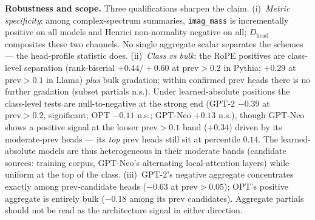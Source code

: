 \documentclass[11pt]{article}
\newcommand{\Dhead}{\ensuremath{D_{\text{head}}}\xspace}
\newcommand{\imagmass}{\texttt{imag\_mass}\xspace}
\newcommand{\Rope}{RoPE\xspace}
\begin{document}
\textbf{Robustness and scope.} Three qualifications sharpen the claim. (i)~\emph{Metric specificity}: among
complex-spectrum summaries, \imagmass is incrementally positive on all models and Henrici non-normality negative on
all; \Dhead composites these two channels. No single aggregate scalar separates the schemes --- the head-profile
statistic does. (ii)~\emph{Class vs bulk}: the \Rope positives are class-level separation (rank-biserial
$+0.44/+0.60$ at $\text{prev}{>}0.2$ in Pythia; $+0.29$ at $\text{prev}{>}0.1$ in Llama) \emph{plus} bulk gradation;
within confirmed prev heads there is no further gradation (subset partials n.s.). Under learned-absolute positions
the class-level tests are null-to-negative at the strong end (GPT-2 $-0.39$ at $\text{prev}{>}0.2$, significant;
OPT $-0.11$ n.s.; GPT-Neo $+0.13$ n.s.), though GPT-Neo shows a positive signal at the looser $\text{prev}{>}0.1$
band ($+0.34$) driven by its moderate-prev heads --- its \emph{top} prev heads still sit at percentile $0.14$. The
learned-absolute models are thus heterogeneous in their moderate bands (candidate sources: training corpus,
GPT-Neo's alternating local-attention layers) while uniform at the top of the class. (iii)~GPT-2's negative
aggregate concentrates exactly among prev-candidate heads ($-0.63$ at $\text{prev}{>}0.05$); OPT's positive
aggregate is entirely bulk ($-0.18$ among its prev candidates). Aggregate partials should not be read as the
architecture signal in either direction.
\end{document}
